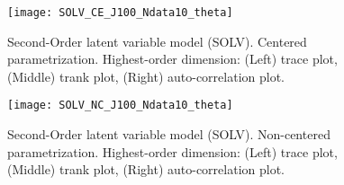 %
\begin{figure}[H]
	\centering
	\texttt{[image: SOLV\_CE\_J100\_Ndata10\_theta]}
	\caption[Second-Order latent variable model (SOLV). Centered parametrization. Highest-order dimension. Trace, trank and auto-correlation plots.]%
	{Second-Order latent variable model (SOLV). Centered parametrization. Highest-order dimension: (Left) trace plot, (Middle) trank plot, (Right) auto-correlation plot.}
	\label{fig:SOLV_CE_chains3}
\end{figure}
%
\begin{figure}[H]
	\centering
	\texttt{[image: SOLV\_NC\_J100\_Ndata10\_theta]}
	\caption[Second-Order latent variable model (SOLV). Non-centered parametrization. Highest-order dimension. Trace, trank and auto-correlation plots.]%
	{Second-Order latent variable model (SOLV). Non-centered parametrization. Highest-order dimension: (Left) trace plot, (Middle) trank plot, (Right) auto-correlation plot.}
	\label{fig:SOLV_NC_chains3}
\end{figure}